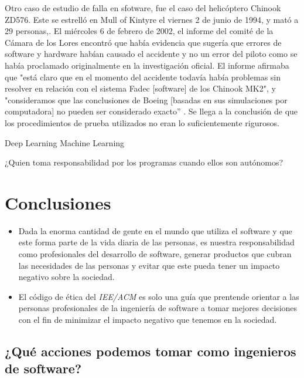 \documentclass[twoside]{article}
\begin{document}
\begin{multicols}{2}
Otro caso de estudio de falla en sfotware, fue el caso del helicóptero Chinook
ZD576. Este se estrelló en Mull of Kintyre el viernes 2 de junio de 1994,  y
mató a 29 personas,. El miércoles 6 de febrero de 2002, el informe del comité de
la Cámara de los Lores encontró que había evidencia que sugería que errores de
software y hardware habían causado el accidente y no un error del piloto como se
había proclamado originalmente en la investigación oficial. El informe afirmaba
que "está claro que en el momento del accidente todavía había problemas sin
resolver en relación con el sistema Fadec [software] de los Chinook MK2", y
"consideramos que las conclusiones de Boeing [basadas en sus simulaciones por
computadora] no pueden ser considerado exacto” \cite{collins2002software}. Se
llega a la conclusión de que los procedimientos de prueba utilizados no eran lo
suficientemente rigurosos.




Deep Learning
Machine Learning

¿Quien toma responsabilidad por los programas cuando ellos son autónomos?




\pagebreak

\section{Conclusiones}

\begin{itemize}
\item Dada la enorma cantidad de gente en el mundo que utiliza el software y
que este forma parte de la vida diaria de las personas, es nuestra
responsabilidad como profesionales del desarrollo de software, generar productos
que cubran las necesidades de las personas y evitar que este pueda tener un
impacto negativo sobre la sociedad.

\item El código de ética del \textit{IEE/ACM} es solo una guía que prentende
orientar a las personas profesionales de la ingeniería de software a tomar
mejores decisiones con el fin de minimizar el impacto negativo que tenemos en la
sociedad.


\end{itemize}

\subsection{¿Qué acciones podemos tomar como ingenieros de software?}


\end{multicols}
\end{document}
